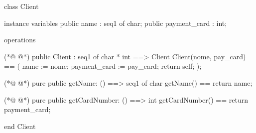 \begin{vdmpp}[breaklines=true]
class Client
 
instance variables
 public name : seq1 of char;
 public payment_card : int; 
 
operations
 
(*@
\label{Client:9}
@*)
 public Client : seq1 of char * int ==> Client
  Client(nome, pay_card) == (
  name := nome;
  payment_card := pay_card;
  return self;
 );
 
(*@
\label{getName:16}
@*)
 pure public getName: () ==> seq1 of char
 getName() == return name;
 
(*@
\label{getCardNumber:19}
@*)
 pure public getCardNumber: () ==> int
 getCardNumber() == return payment_card;
 
end Client
\end{vdmpp}
